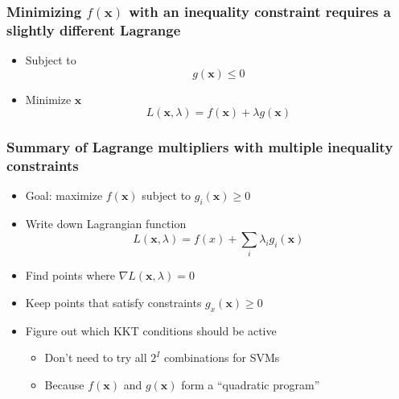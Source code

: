 \documentclass[12pt,notes,mathserif]{beamer}
\begin{document}
\begin{frame}[c]
	\frametitle{Minimizing $f(\mathbf{x})$ with an inequality constraint requires a slightly different Lagrange}
	\begin{itemize}
		\item Subject to
		      \[
			      g(\mathbf{x}) \le 0
		      \]

		\item Minimize \wrt $\mathbf{x}$
		      \[
			      L(\mathbf{x},\lambda)=f(\mathbf{x})+\lambda g(\mathbf{x})
		      \]
	\end{itemize}
\end{frame}


\begin{frame}[c]
	\frametitle{Summary of Lagrange multipliers with multiple inequality constraints}
	\begin{itemize}
		\item Goal: maximize $f(\mathbf{x})$ subject to $g_i(\mathbf{x})\geqslant{} 0$
		\item Write down Lagrangian function
		      \[
			      L(\mathbf{x},\lambda)=f(x)+\sum_i\lambda_ig_i(\mathbf{x})
		      \]
		\item Find points where $\nabla L(\mathbf{x},\lambda)= 0$
		\item Keep points that satisfy constraints $g_x(\mathbf{x})\geqslant{}0$
		\item Figure out which KKT conditions should be active
		      \begin{itemize}
			      \item Don't need to try all $2^I$ combinations for SVMs
			      \item Because $f(\mathbf{x})$ and $g(\mathbf{x})$ form a ``quadratic program''
		      \end{itemize}
	\end{itemize}
\end{frame}
\end{document}
